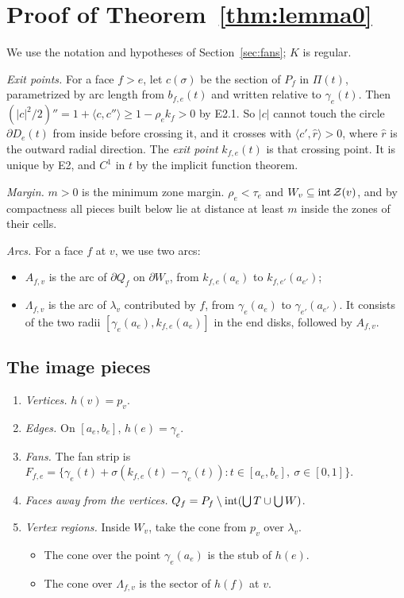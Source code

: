 \section{Proof of Theorem~\ref{thm:lemma0}}\label{sec:proof51}

We use the notation and hypotheses of Section~\ref{sec:fans}; $K$ is regular.

\emph{Exit points.} For a face $f>e$, let $c(\sigma)$ be the section of $P_f$ in $\Pi(t)$, parametrized by arc length
from $b_{f,e}(t)$ and written relative to $\gamma_e(t)$. Then $(|c|^2/2)''=1+\langle c,c''\rangle\ge1-\rho_ek_f>0$ by
E2.1. So $|c|$ cannot touch the circle $\partial D_e(t)$ from inside before crossing it, and it crosses with
$\langle c',\hat r\rangle>0$, where $\hat r$ is the outward radial direction. The \emph{exit point} $k_{f,e}(t)$ is that
crossing point. It is unique by E2, and $C^1$ in $t$ by the implicit function theorem.

\emph{Margin.} $m>0$ is the minimum zone margin. $\rho_e<\tau_e$ and $W_v\subseteq\operatorname{int}\mathcal{Z}(v)$, and by compactness all
pieces built below lie at distance at least $m$ inside the zones of their cells.

\emph{Arcs.} For a face $f$ at $v$, we use two arcs:
\begin{itemize}
\item $A_{f,v}$ is the arc of $\partial Q_f$ on $\partial W_v$, from $k_{f,e}(a_e)$ to $k_{f,e'}(a_{e'})$;
\item $\Lambda_{f,v}$ is the arc of $\lambda_v$ contributed by $f$, from $\gamma_e(a_e)$ to $\gamma_{e'}(a_{e'})$. It
consists of the two radii $[\gamma_e(a_e),k_{f,e}(a_e)]$ in the end disks, followed by $A_{f,v}$.
\end{itemize}

\subsection{The image pieces}
\begin{enumerate}
\item \emph{Vertices.} $h(v)=p_v$.
\item \emph{Edges.} On $[a_e,b_e]$, $h(e)=\gamma_e$.
\item \emph{Fans.} The fan strip is $F_{f,e}=\{\gamma_e(t)+\sigma(k_{f,e}(t)-\gamma_e(t)):t\in[a_e,b_e],\ \sigma\in[0,1]\}$.
\item \emph{Faces away from the vertices.} $Q_f=P_f\setminus\operatorname{int}(\bigcup T\cup\bigcup W)$.
\item \emph{Vertex regions.} Inside $W_v$, take the cone from $p_v$ over $\lambda_v$.
  \begin{itemize}
  \item The cone over the point $\gamma_e(a_e)$ is the stub of $h(e)$.
  \item The cone over $\Lambda_{f,v}$ is the sector of $h(f)$ at $v$.
  \end{itemize}
\end{enumerate}

